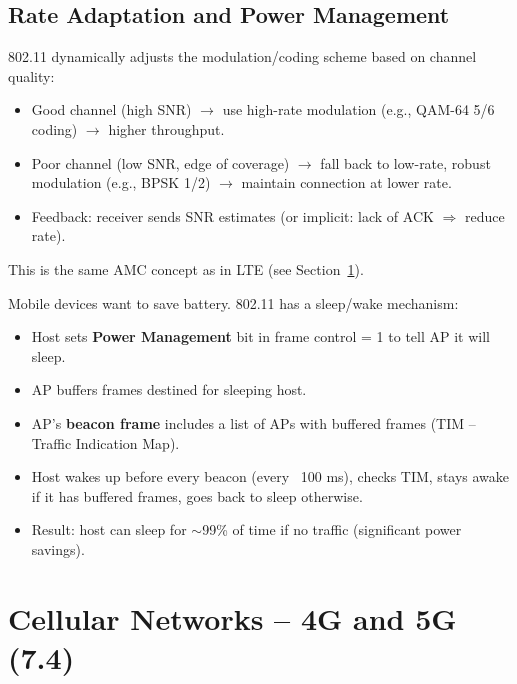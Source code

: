 \begin{imagebox}
\end{imagebox}

\subsection{Rate Adaptation and Power Management}

\begin{keybox}
802.11 dynamically adjusts the modulation/coding scheme based on channel quality:
\begin{itemize}[noitemsep]
    \item Good channel (high SNR) $\rightarrow$ use high-rate modulation (e.g., QAM-64 5/6 coding) $\rightarrow$ higher throughput.
    \item Poor channel (low SNR, edge of coverage) $\rightarrow$ fall back to low-rate, robust modulation (e.g., BPSK 1/2) $\rightarrow$ maintain connection at lower rate.
    \item Feedback: receiver sends SNR estimates (or implicit: lack of ACK $\Rightarrow$ reduce rate).
\end{itemize}
This is the same AMC concept as in LTE (see Section~\ref{sec:4g}).
\end{keybox}

\begin{keybox}
Mobile devices want to save battery. 802.11 has a sleep/wake mechanism:
\begin{itemize}[noitemsep]
    \item Host sets \textbf{Power Management} bit in frame control = 1 to tell AP it will sleep.
    \item AP buffers frames destined for sleeping host.
    \item AP's \textbf{beacon frame} includes a list of APs with buffered frames (TIM -- Traffic Indication Map).
    \item Host wakes up before every beacon (every ~100 ms), checks TIM, stays awake if it has buffered frames, goes back to sleep otherwise.
    \item Result: host can sleep for $\sim$99\% of time if no traffic (significant power savings).
\end{itemize}
\end{keybox}

\section{Cellular Networks -- 4G and 5G (7.4)}
\label{sec:4g}

